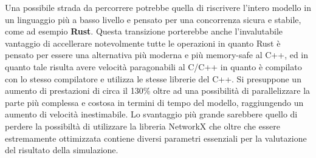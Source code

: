 \documentclass[a4paper,12pt]{article}
\begin{document}
\begin{description}
Una possibile strada da percorrere potrebbe quella di riscrivere l'intero modello in un linguaggio pi\`u a basso livello e pensato per una concorrenza sicura e stabile, come ad esempio \textbf{Rust}. Questa transizione porterebbe anche l'invalutabile vantaggio di accellerare notevolmente tutte le operazioni in quanto Rust \`e pensato per essere una alternativa pi\`u moderna e pi\`u memory-safe al C++, ed in quanto tale risulta avere velocit\`a paragonabili al C/C++ in quanto \`e compilato con lo stesso compilatore e utilizza le stesse librerie del C++. Si presuppone un aumento di prestazioni di circa il 130\% oltre ad una possibilit\`a di parallelizzare la parte pi\`u complessa e costosa in termini di tempo del modello, raggiungendo un aumento di velocit\`a inestimabile. 
Lo svantaggio pi\`u grande sarebbere quello di perdere la possibilt\`a di utilizzare la libreria NetworkX che oltre che essere estremamente ottimizzata contiene diversi parametri essenziali per la valutazione del risultato della simulazione.
\end{description}
\end{document}
